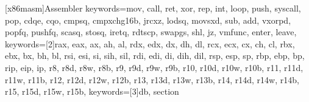 
\newcommand\lsthl[1]{{\color{Cyan}#1}}

   [x86masm]{Assembler}
   {keywords={mov, call, ret, xor, rep, int, loop, push, syscall, pop,
        cdqe, cqo, cmpsq, cmpxchg16b, jrcxz, lodsq, movsxd, sub, add,
        vxorpd, popfq, pushfq, scasq, stosq, iretq, rdtscp, swapgs, shl, jz,
        vmfunc, enter, leave},
    keywords=[2]{rax, eax, ax, ah, al,
           rdx, edx, dx, dh, dl,
     rcx, ecx, cx, ch, cl,
     rbx, ebx, bx, bh, bl,
     rsi, esi, si, sih, sil,
     rdi, edi, di, dih, dil,
     rsp, esp, sp, rbp, ebp, bp, rip, eip, ip,
                 r8, r8d, r8w, r8b, r9, r9d, r9w, r9b,
           r10, r10d, r10w, r10b, r11, r11d, r11w, r11b,
           r12, r12d, r12w, r12b, r13, r13d, r13w, r13b,
           r14, r14d, r14w, r14b, r15, r15d, r15w, r15b},
     keywords=[3]{db, section}
   }

\newcommand{\ftabwidth}{7cm}
\newcommand{\ftabinnerwidth}{10cm}
\newcommand{\thead}{\rowcolor{Dandelion}}
\newcommand{\todd}{\rowcolor{Dandelion!50}}
\newcommand{\teven}{\rowcolor{Dandelion!30}}
\newcommand{\colorbitbox}[3]{%
\rlap{\bitbox{#2}{\color{#1}\rule{\width}{\height}}}%
\bitbox{#2}{#3}}

\setlength{\unitlength}{18mm}
\newcommand{\blob}{\textcolor{Gray}{\rule[-.2\unitlength]{2\unitlength}{.5\unitlength}}}

\newcommand\rblob{\rightmark
\begin{picture}(0,0)
\put(1,-\value{section}){\blob}
\end{picture}}

\newcommand\lblob{%
	\begin{picture}(0,0)
	\put(-3,-\value{section}){\blob}
	\end{picture}%
\thepage}

\clearpairofpagestyles
{}

\ohead{\itshape \rblob}
\ofoot{\pagemark}

